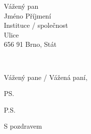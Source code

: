 \documentclass[a4paper,11pt,oneside,onecolumn,final]{letter}
\makeatletter
\renewcommand*{\opening}[1]{%
  \thispagestyle{firstpage}%
  \begin{flushright}
    \toname \\ \toaddress
  \end{flushright}
  \vspace{2\parskip}%
  #1\par\nobreak}
\renewcommand{\closing}[1]{\par\nobreak\vspace{\parskip}%
  \stopbreaks
  \noindent
  \ifx\@empty\fromaddress\else
  \hspace*{\longindentation}\fi
  \parbox{\indentedwidth}{\raggedright
       \ignorespaces #1\\[6\medskipamount]%
       \ifx\@empty\fromsig
           \fromname
       \else \fromsig \fi\strut}%
   \par}
\makeatother
\begin{document}
\begin{letter}{%
  Vážený pan \\
  Jméno Příjmení \\
  Instituce / společnost \\
  Ulice \\
  656 91 Brno, Stát }
\opening{Vážený pane / Vážená paní,}

\Blindtext
\Blindtext

\ps

P.S. \blindtext

\closing{S pozdravem}



\end{letter}
\end{document}
